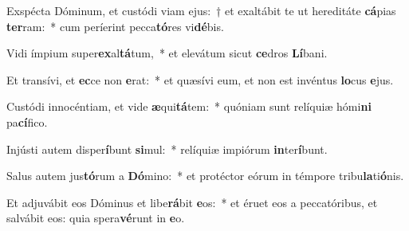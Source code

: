 \item Exspécta Dóminum, et custódi viam ejus:~† et exaltábit te ut hereditáte \textbf{cá}pias \textbf{ter}ram:~* cum períerint pecca\textbf{tó}res vi\textbf{dé}bis.
\item Vidi ímpium super\textbf{ex}al\textbf{tá}tum,~* et elevátum sicut \textbf{ce}dros \textbf{Lí}bani.
\item Et transívi, et \textbf{ec}ce non \textbf{e}rat:~* et quæsívi eum, et non est invéntus \textbf{lo}cus \textbf{e}jus.
\item Custódi innocéntiam, et vide \textbf{æ}qui\textbf{tá}tem:~* quóniam sunt relíquiæ hómi\textbf{ni} pa\textbf{cí}fico.
\item Injústi autem disper\textbf{í}bunt \textbf{si}mul:~* relíquiæ impiórum \textbf{in}ter\textbf{í}bunt.
\item Salus autem jus\textbf{tó}rum a \textbf{Dó}mino:~* et protéctor eórum in témpore tribu\textbf{la}ti\textbf{ó}nis.
\item Et adjuvábit eos Dóminus et libe\textbf{rá}bit \textbf{e}os:~* et éruet eos a peccatóribus, et salvábit eos: quia spera\textbf{vé}runt in \textbf{e}o.
